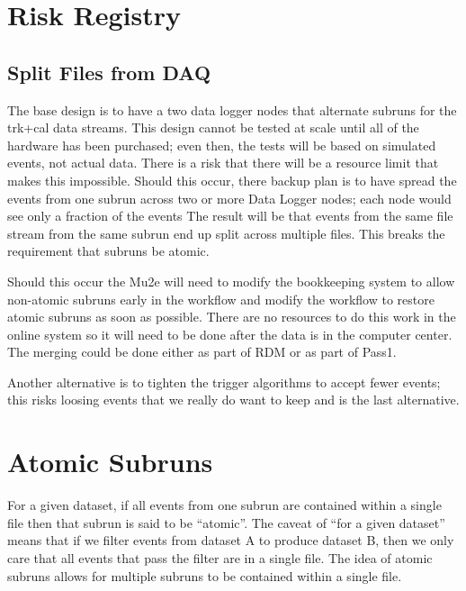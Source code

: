 \chapter{Risk Registry}
\label{ch:RiskRegistry}

\section{Split Files from DAQ}
\label{sec:Risk:SplitFiles}

The base design is to have a two data logger nodes that alternate subruns
for the trk+cal data streams.
This design cannot be tested at scale until all of the hardware has been purchased;
even then, the tests will be based on simulated events, not actual data.
There is a risk that there will be a resource limit that makes this impossible.
Should this occur, there backup plan is to have spread the events from one
subrun across two or more Data Logger nodes;
each node would see only a fraction of the events
The result will be that events from the same file stream
from the same subrun end up split across multiple files.
This breaks the requirement that subruns be atomic.

Should this occur the Mu2e will need to modify the bookkeeping system to allow non-atomic subruns early
in the workflow and modify the workflow to restore atomic subruns as soon as possible.
There are no resources to do this work in the online system so it will need to be done
after the data is in the computer center.
The merging could be done either as part of RDM or as part of Pass1.

Another alternative is to tighten the trigger algorithms to accept fewer events;
this risks loosing events that we really do want to keep and is the last alternative.

\appendix

\chapter{Atomic Subruns}
\label{ch:AtomicSubrunsExtendedDefinition}

For a given dataset, if all events from one subrun are contained within a single \art file
then that subrun is said to be ``atomic''.
The caveat of ``for a given dataset'' means that if we filter events from dataset A
to produce dataset B, then we only care that all events that pass the filter are in a single file.
The idea of atomic subruns allows for multiple subruns to be contained within a single file.

